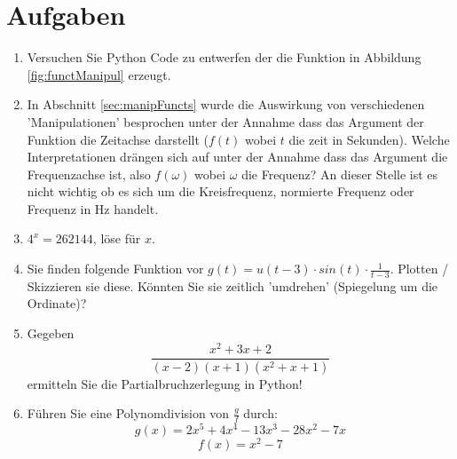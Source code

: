 \section{Aufgaben}
\begin{enumerate}
\item Versuchen Sie Python Code zu entwerfen der die Funktion in Abbildung \ref{fig:functManipul} erzeugt.
\item In Abschnitt \ref{sec:manipFuncts} wurde die Auswirkung von verschiedenen 'Manipulationen' besprochen unter der Annahme dass das Argument der Funktion die Zeitachse darstellt ($f(t)$ wobei $t$ die zeit in Sekunden). Welche Interpretationen drängen sich auf unter der Annahme dass das Argument die Frequenzachse ist, also $f(\omega)$ wobei $\omega$ die Frequenz? An dieser Stelle ist es nicht wichtig ob es sich um die Kreisfrequenz, normierte Frequenz oder Frequenz in Hz handelt.

\item $4^x = 262144$, löse für $x$.

\item Sie finden folgende Funktion vor $g(t) = u(t-3) \cdot sin(t) \cdot \frac{1}{t-3}$. Plotten / Skizzieren sie diese. Könnten Sie sie zeitlich 'umdrehen' (Spiegelung um die Ordinate)?

\item Gegeben $$ \frac{x^{2} + 3 x + 2}{\left(x - 2\right) \left(x + 1\right) \left(x^{2} + x + 1\right)}$$ ermitteln Sie die Partialbruchzerlegung in Python!

\item Führen Sie eine Polynomdivision von $\frac{g}{f}$ durch:
$$g(x) = 2 x^{5} + 4 x^{4} - 13 x^{3} - 28 x^{2} - 7 x $$
$$f(x) = x^2-7 $$

\end{enumerate}
